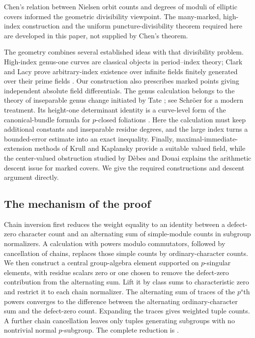 Chen's relation between Nielsen orbit counts and degrees of moduli of
elliptic covers \cite{Chen2024} informed the geometric divisibility
viewpoint. The many-marked, high-index construction and the uniform
puncture-divisibility theorem required here are developed in this paper,
not supplied by Chen's theorem.

The geometry combines several established ideas with that divisibility
problem. High-index genus-one curves are classical objects in period--index
theory; Clark and Lacy prove arbitrary-index existence over infinite fields
finitely generated over their prime fields \cite{ClarkLacy2019}. Our
construction also prescribes marked points giving independent absolute
field differentials. The genus calculation belongs to the theory of inseparable genus
change initiated by Tate \cite{Tate1952}; see Schr\"oer
\cite{Schroer2009} for a modern treatment. Its height-one determinant
identity is a curve-level form of the canonical-bundle formula for
$p$-closed foliations \cite{Ekedahl1988}. Here the calculation must keep
additional constants and inseparable residue degrees, and the large index
turns a bounded-error estimate into an exact inequality. Finally,
maximal-immediate-extension methods of Krull and Kaplansky
\cite{Krull1932,Kaplansky1942,Poonen1993} provide a suitable valued field,
while the center-valued obstruction studied by D\`ebes and Douai
\cite{DebesDouai1997} explains the arithmetic descent issue for marked
covers. We give the required constructions and descent argument directly.

\subsection*{The mechanism of the proof}

Chain inversion first reduces the weight equality to an identity between
a defect-zero character count and an alternating sum of simple-module
counts in subgroup normalizers. A calculation with powers modulo
commutators, followed by cancellation of chains, replaces those simple
counts by ordinary-character counts. We then construct a central
group-algebra element supported on $p$-singular elements, with residue
scalars zero or one chosen to remove the defect-zero contribution from
the alternating sum. Lift it by class sums to characteristic zero and restrict
it to each chain normalizer. The alternating sum of traces of the
$p^s$th powers converges to the difference between the alternating
ordinary-character sum and the defect-zero count.
Expanding the traces gives weighted tuple counts. A further chain
cancellation leaves only tuples generating subgroups with no nontrivial
normal $p$-subgroup. The complete reduction is
.

